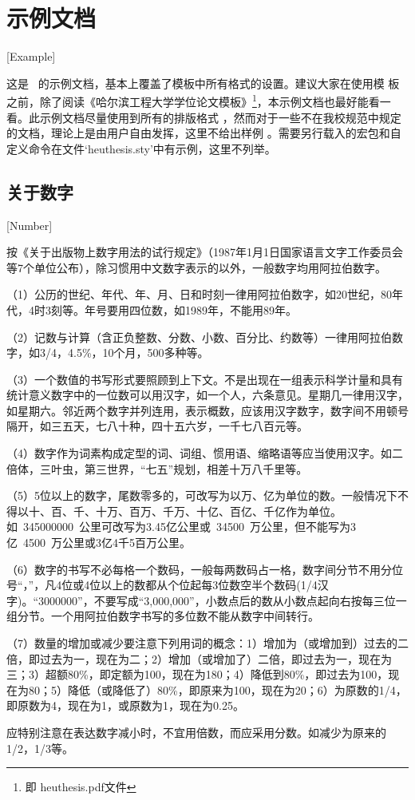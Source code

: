 
\chapter{示例文档}[Example]
\label{ch_example}

这是 \heuthesis\ 的示例文档，基本上覆盖了模板中所有格式的设置。建议大家在使用模
板之前，除了阅读《\heuthesis\:哈尔滨工程大学学位论文模板》\footnote{即
  heuthesis.pdf文件}，本示例文档也最好能看一看。此示例文档尽量使用到所有的排版格式
，然而对于一些不在我校规范中规定的文档，理论上是由用户自由发挥，这里不给出样例
。需要另行载入的宏包和自定义命令在文件`heuthesis.sty'中有示例，这里不列举。

\section{关于数字}[Number]

按《关于出版物上数字用法的试行规定》（1987年1月1日国家语言文字工作委员会等7个单位公布），除习惯用中文数字表示的以外，一般数字均用阿拉伯数字。\par
（1）公历的世纪、年代、年、月、日和时刻一律用阿拉伯数字，如20世纪，80年代，4时3刻等。年号要用四位数，如1989年，不能用89年。\par
（2）记数与计算（含正负整数、分数、小数、百分比、约数等）一律用阿拉伯数字，如3/4，4.5\%，10个月，500多种等。\par
（3）一个数值的书写形式要照顾到上下文。不是出现在一组表示科学计量和具有统计意义数字中的一位数可以用汉字，如一个人，六条意见。星期几一律用汉字，如星期六。邻近两个数字并列连用，表示概数，应该用汉字数字，数字间不用顿号隔开，如三五天，七八十种，四十五六岁，一千七八百元等。\par
（4）数字作为词素构成定型的词、词组、惯用语、缩略语等应当使用汉字。如二倍体，三叶虫，第三世界，“七五”规划，相差十万八千里等。\par
（5）5位以上的数字，尾数零多的，可改写为以万、亿为单位的数。一般情况下不得以十、百、千、十万、百万、千万、十亿、百亿、千亿作为单位。如~\num{345000000}~公里可改写为3.45亿公里或~\num{34500}~万公里，但不能写为3亿~\num{4500}~万公里或3亿4千5百万公里。\par
（6）数字的书写不必每格一个数码，一般每两数码占一格，数字间分节不用分位号“，”，凡4位或4位以上的数都从个位起每3位数空半个数码(1/4汉字)。“\num{3000000}”，不要写成“3,000,000”，小数点后的数从小数点起向右按每三位一组分节。一个用阿拉伯数字书写的多位数不能从数字中间转行。\par
（7）数量的增加或减少要注意下列用词的概念：1）增加为（或增加到）过去的二倍，即过去为一，现在为二；2）增加（或增加了）二倍，即过去为一，现在为三；3）超额80\%，即定额为100，现在为180；4）降低到80\%，即过去为100，现在为80；5）降低（或降低了）80\%，即原来为100，现在为20；6）为原数的1/4，即原数为4，现在为1，或原数为1，现在为0.25。\par
应特别注意在表达数字减小时，不宜用倍数，而应采用分数。如减少为原来的1/2，1/3等。



